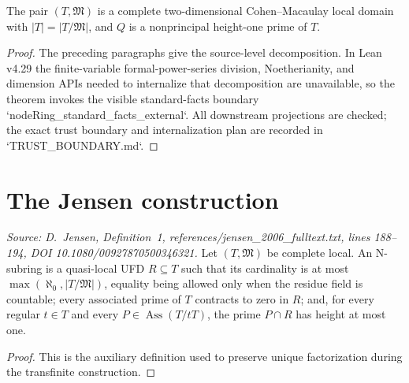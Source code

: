 \begin{lemma}
  \label{lem:complete_domain_choice}
  The pair \((T,\mathfrak M)\) is a complete two-dimensional
  Cohen--Macaulay local domain with \(|T|=|T/\mathfrak M|\), and \(Q\) is a
  nonprincipal height-one prime of \(T\).
\end{lemma}

\begin{proof}
  The preceding paragraphs give the source-level decomposition.  In Lean v4.29
  the finite-variable formal-power-series division, Noetherianity, and dimension
  APIs needed to internalize that decomposition are unavailable, so the theorem
  invokes the visible standard-facts boundary
  `nodeRing_standard_facts_external`.  All downstream projections are checked;
  the exact trust boundary and internalization plan are recorded in
  `TRUST_BOUNDARY.md`.
\end{proof}

\section{The Jensen construction}

\begin{definition}[N-subring]
  \label{def:n_subring}
  \textit{Source: D.~Jensen, Definition~1,
  references/jensen\_2006\_fulltext.txt, lines 188--194,
  DOI 10.1080/00927870500346321.}
  Let \((T,\mathfrak M)\) be complete local.  An N-subring is a quasi-local
  UFD \(R\subseteq T\) such that its cardinality is at most
  \(\max(\aleph_0,|T/\mathfrak M|)\), equality being allowed only when the
  residue field is countable; every associated prime of \(T\) contracts to
  zero in \(R\); and, for every regular \(t\in T\) and every
  \(P\in\operatorname{Ass}(T/tT)\), the prime \(P\cap R\) has height at most
  one.
\end{definition}

\begin{proof}
  This is the auxiliary definition used to preserve unique factorization
  during the transfinite construction.
\end{proof}

